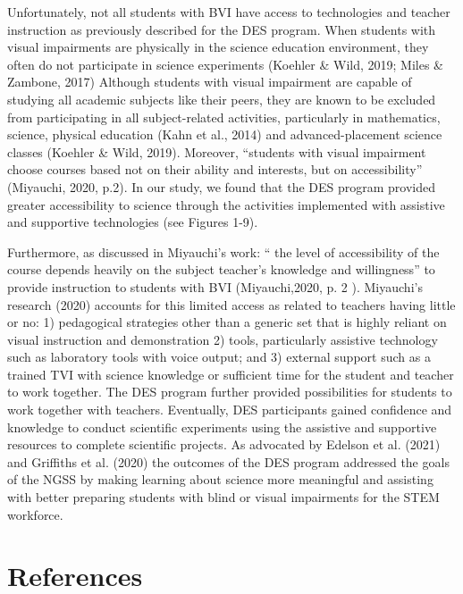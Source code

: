 \documentclass[11.5pt]{sig-alternate}
\begin{document}
\begin{large}
Unfortunately, not all students with BVI have access to technologies and teacher instruction as previously described for the DES program.  When students with visual impairments are physically in the science education environment, they often do not participate in science experiments (Koehler \& Wild, 2019; Miles \& Zambone, 2017)  Although students with visual impairment are capable of studying all academic subjects like their peers, they are known to be excluded from participating in all subject-related activities, particularly in mathematics, science, physical education (Kahn et al., 2014) and advanced-placement science classes (Koehler \& Wild, 2019). Moreover, “students with visual impairment choose courses based not on their ability and interests, but on accessibility” (Miyauchi, 2020, p.2).  In our study, we found that the DES program provided greater accessibility to science through the activities implemented with assistive and supportive technologies (see Figures 1-9).

Furthermore, as discussed in Miyauchi’s work:  “ the level of accessibility of the course depends heavily on the subject teacher’s knowledge and willingness” to provide instruction to students with BVI (Miyauchi,2020,  p. 2 ). Miyauchi’s research (2020) accounts for this limited access as related to teachers having little or no: 1) pedagogical strategies other than a generic set that is highly reliant on visual instruction and demonstration 2) tools, particularly assistive technology such as laboratory tools with voice output; and 3) external support such as a trained TVI with science knowledge or sufficient time for the student and teacher to work together.  The DES program further provided possibilities for students to work together with teachers. Eventually, DES participants gained confidence and knowledge to conduct scientific experiments using the assistive and supportive resources to complete scientific projects.  As advocated by Edelson et al. (2021) and Griffiths et al. (2020) the outcomes of the DES program addressed the goals of the NGSS by making learning about science more meaningful and assisting with better preparing students with blind or visual impairments for the STEM workforce.  

 
\section*{References}
\par 

\leftskip 0.25in
\parindent -0.25in 


\end{large}
\end{document}
